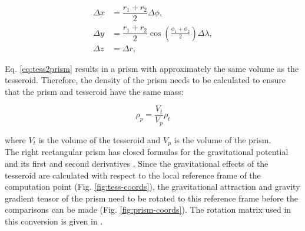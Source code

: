 \documentclass[a4paper,twocolumn]{esapub2005} %
\begin{document}
\begin{equation}
\begin{split}
\Delta x &= \dfrac{r_1 + r_2}{2} \Delta \phi, \\
\Delta y &= \dfrac{r_1 + r_2}{2} \cos\left(\frac{\phi_1 + \phi_2}{2}\right) \Delta\lambda, \\
\Delta z &= \Delta r,
\end{split}
\label{eq:tess2prism}
\end{equation}

Eq. \ref{eq:tess2prism} results in a prism with approximately the same volume as the
tesseroid. Therefore, the density of the prism needs to be calculated to ensure that
the prism and tesseroid have the same mass:

\begin{equation}
\rho_p = \dfrac{V_t}{V_p} \rho_t
\label{eq:prismdens}
\end{equation}

where $V_t$ is the volume of the tesseroid and $V_p$ is the volume of the prism.
\\[0.2cm]
The right rectangular prism has closed formulas for the gravitational potential and its
first and second derivatives \citep{nagy2000}.
Since the gravitational effects of the tesseroid are calculated with respect to
the local reference frame of the computation point (Fig. \ref{fig:tess-coords}),
the gravitational attraction and gravity gradient tensor of the prism need to be
rotated to this reference frame before the comparisons can be made (Fig. \ref{fig:prism-coords}).
The rotation matrix used in this conversion is given in \citet{wild2008}.
\end{document}
